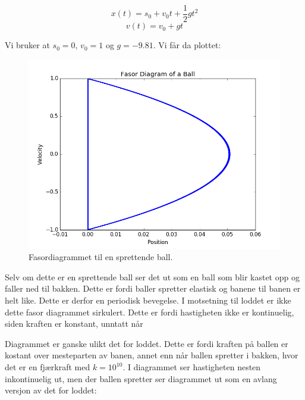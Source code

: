 \documentclass[a4paper,norsk, 10pt]{article}
\begin{document}
$$
x(t) =s_0 + v_0t + \frac{1}{2}gt^2
$$
$$
v(t) = v_0 + gt
$$

Vi bruker at $s_0 = 0$, $v_0 = 1$ og $g = -9.81$. Vi får da plottet:

\begin{figure}[H]
\centering

\includegraphics[scale=0.5]{ballFasor.png}
\caption{Fasordiagrammet til en sprettende ball.}
\end{figure}

Selv om dette er en sprettende ball ser det ut som en ball som blir kastet opp og faller ned til bakken. Dette er fordi baller spretter elastisk og banene til banen er helt like. Dette er derfor en periodisk bevegelse. I motsetning til loddet er ikke dette fasor diagrammet sirkulert. Dette er fordi hastigheten ikke er kontinuelig, siden kraften er konstant, unntatt når 

Diagrammet er ganske ulikt det for loddet. Dette er fordi kraften på ballen er kostant over mesteparten av banen, annet enn når ballen spretter i bakken, hvor det er en fjærkraft med $k = 10^{10}$. I diagrammet ser hastigheten nesten inkontinuelig ut, men der ballen spretter ser diagrammet ut som en avlang versjon av det for loddet:
\end{document}
